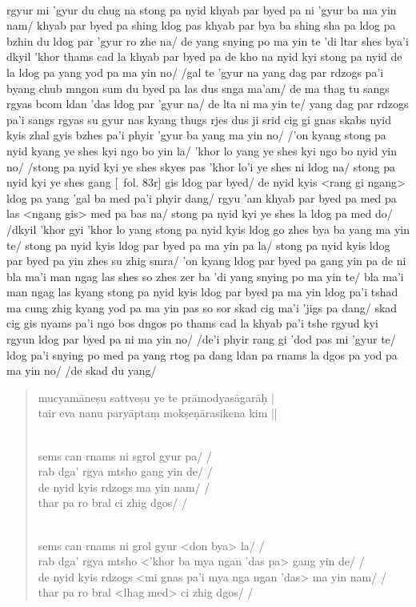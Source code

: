 \documentclass[12pt]{article}
\begin{document}
\textbf{\TVB}\\
rgyur mi 'gyur du chug na stong pa nyid khyab par byed pa ni 'gyur ba ma yin nam/ khyab par byed pa shing ldog pas khyab par bya ba shing sha pa ldog pa bzhin du ldog par 'gyur ro zhe na/ de yang snying po ma yin te 'di ltar shes bya'i dkyil 'khor thams cad la khyab par byed pa de kho na nyid kyi stong pa nyid de la ldog pa yang yod pa ma yin no/ /gal te 'gyur na yang dag par rdzogs pa'i byang chub mngon sum du byed pa las dus snga ma'am/ de ma thag tu sangs rgyas bcom ldan 'das ldog par 'gyur na/ de lta ni ma yin te/ yang dag par rdzogs pa'i sangs rgyas su gyur nas kyang thugs rjes dus ji srid cig gi gnas skabs nyid kyis zhal gyis bzhes pa'i phyir 'gyur ba yang ma yin no/ /'on kyang stong pa nyid kyang ye shes kyi ngo bo yin la/ 'khor lo yang ye shes kyi ngo bo nyid yin no/ /stong pa nyid kyi ye shes skyes pas 'khor lo'i ye shes ni ldog na/ stong pa nyid kyi ye shes gang [\TVB\ fol. 83r] gis ldog par byed/ de nyid kyis <rang gi ngang> ldog pa yang 'gal ba med pa'i phyir dang/ rgyu 'am khyab par byed pa med pa las <ngang gis> med pa bas na/ stong pa nyid kyi ye shes la ldog pa med do/ /dkyil 'khor gyi 'khor lo yang stong pa nyid kyis ldog go zhes bya ba yang ma yin te/ stong pa nyid kyis ldog par byed pa ma yin pa la/ stong pa nyid kyis ldog par byed pa yin zhes su zhig smra/ 'on kyang ldog par byed pa gang yin pa de ni bla ma'i man ngag las shes so zhes zer ba 'di yang snying po ma yin te/ bla ma'i man ngag las kyang stong pa nyid kyis ldog par byed pa ma yin ldog pa'i tshad ma cung zhig kyang yod pa ma yin pas so sor skad cig ma'i 'jigs pa dang/ skad cig gis nyams pa'i ngo bos dngos po thams cad la khyab pa'i tshe rgyud kyi rgyun ldog par byed pa ni ma yin no/ /de'i phyir rang gi 'dod pas mi 'gyur te/ ldog pa'i snying po med pa yang rtog pa dang ldan pa rnams la dgos pa yod pa ma yin no/ /de skad du yang/

\begin{quote}
	mucyamāneṣu sattveṣu ye te prāmodyasāgarāḥ | \\
	tair eva nanu paryāptaṃ mokṣeṇārasikena kim ||

	\textbf{\TVA}\\
	sems can rnams ni sgrol gyur pa/ /\\
	rab dga' rgya mtsho gang yin de/ /\\
	de nyid kyis rdzogs ma yin nam/ /\\
	thar pa ro bral ci zhig dgos/ /

	\textbf{\TVB}\\
	sems can rnams ni grol gyur <don bya> la/ /\\
	rab dga' rgya mtsho <'khor ba mya ngan 'das pa> gang yin de/ /\\
	de nyid kyis rdzogs <mi gnas pa'i mya nga ngan 'das> ma yin nam/ /\\
	thar pa ro bral <lhag med> ci zhig dgos/ /
\end{quote}
\end{document}
